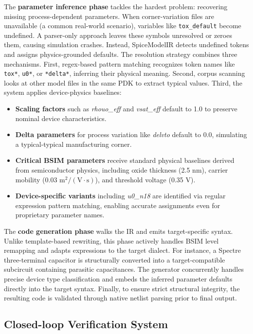 \documentclass[conference]{IEEEtran}
\begin{document}
The \textbf{parameter inference phase} tackles the hardest problem: recovering missing process-dependent parameters. When corner-variation files are unavailable (a common real-world scenario), variables like \texttt{tox\_default} become undefined. A parser-only approach leaves these symbols unresolved or zeroes them, causing simulation crashes. Instead, SpiceModelIR detects undefined tokens and assigns physics-grounded defaults. The resolution strategy combines three mechanisms. First, regex-based pattern matching recognizes token names like \texttt{tox*}, \texttt{u0*}, or \texttt{*delta*}, inferring their physical meaning. Second, corpus scanning looks at other model files in the same PDK to extract typical values. Third, the system applies device-physics baselines:
\begin{itemize}
    \item \textbf{Scaling factors} such as \textit{rhouo\_eff} and \textit{vsat\_eff} default to 1.0 to preserve nominal device characteristics.
    \item \textbf{Delta parameters} for process variation like \textit{delvto} default to 0.0, simulating a typical-typical manufacturing corner.
    \item \textbf{Critical BSIM parameters} receive standard physical baselines derived from semiconductor physics, including oxide thickness (2.5 nm), carrier mobility ($0.03 \text{ m}^2/(\text{V}\cdot\text{s})$), and threshold voltage (0.35 V).
    \item \textbf{Device-specific variants} including \textit{u0\_n18} are identified via regular expression pattern matching, enabling accurate assignments even for proprietary parameter names.
\end{itemize}

The \textbf{code generation phase} walks the IR and emits target-specific syntax. Unlike template-based rewriting, this phase actively handles BSIM level remapping and adapts expressions to the target dialect. For instance, a Spectre three-terminal capacitor is structurally converted into a target-compatible subcircuit containing parasitic capacitances. The generator concurrently handles precise device type classification and embeds the inferred parameter defaults directly into the target syntax. Finally, to ensure strict structural integrity, the resulting code is validated through native netlist parsing prior to final output.

\subsection{Closed-loop Verification System}
\end{document}
